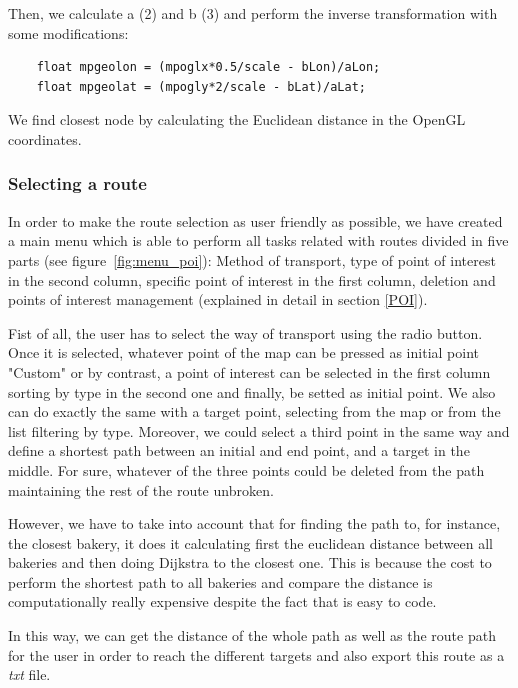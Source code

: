 \documentclass{article}
\begin{document}
Then, we calculate a (2) and b (3) and perform the inverse transformation with some modifications:

\begin{lstlisting}
    float mpgeolon = (mpoglx*0.5/scale - bLon)/aLon;
    float mpgeolat = (mpogly*2/scale - bLat)/aLat;
\end{lstlisting}


We find closest node by calculating the Euclidean distance in the OpenGL coordinates.



\subsubsection{Selecting a route}
In order to make the route selection as user friendly as possible, we have created a main menu which is able to perform all tasks related with routes divided in five parts (see figure~\ref{fig:menu_poi}): Method of transport, type of point of interest in the second column, specific point of interest in the first column, deletion and points of interest management (explained in detail in section \ref{POI}).

Fist of all, the user has to select the way of transport using the radio button. Once it is selected, whatever point of the map can be pressed as initial point "Custom" or by contrast, a point of interest can be selected in the first column sorting by type in the second one and finally, be setted as initial point. We also can do exactly the same with a target point, selecting from the map or from the list filtering by type. Moreover, we could select a third point in the same way and define a shortest path between an initial and end point, and a target in the middle. For sure, whatever of the three points could be deleted from the path maintaining the rest of the route unbroken.

However, we have to take into account that for finding the path to, for instance, the closest bakery, it does it calculating first the euclidean distance between all bakeries and then doing Dijkstra to the closest one. This is because the cost to perform the shortest path to all bakeries and compare the distance is computationally really expensive despite the fact that is easy to code.

In this way, we can get the distance of the whole path as well as the route path for the user in order to reach the different targets and also export this route as a \textit{txt} file.
\end{document}
